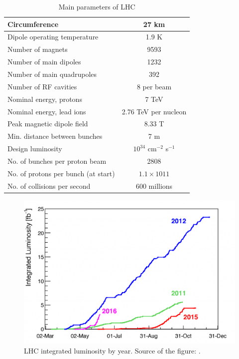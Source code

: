 \begin{table}[h]
  \begin{center}
  \caption{ Main parameters of LHC \cite{ref_LHC_brochure}}
  \vspace{5 mm}
  \begin{tabular}{|l|c|}
     \hline
     Circumference & 27 km  \\ \hline
     Dipole operating temperature &  1.9 K \\ \hline
     Number of magnets &  9593 \\ \hline
     Number of main dipoles &  1232 \\ \hline
     Number of main quadrupoles &  392 \\ \hline
     Number of RF cavities &  8 per beam \\ \hline
     Nominal energy, protons &  7 TeV \\ \hline
     Nominal energy, lead ions &  2.76 TeV per nucleon \\ \hline
     Peak magnetic dipole field &  8.33 T \\ \hline
     Min. distance between bunches &  7 m \\ \hline
     Design luminosity &  $10^{34}$ cm$^{-2}$ s$^{-1}$ \\ \hline
     No. of bunches per proton beam &  2808 \\ \hline
     No. of protons per bunch (at start) &  $1.1\times 10{11}$ \\ \hline
     No. of collisions per second &  600 millions \\ \hline
  \end{tabular}
  \label{tab:LHCparameters}
  \end{center}
 \end{table}

\begin{figure}
  \centering
  \includegraphics[width=.80\linewidth]{../figs/Exp/LHC_lumi.png}
  \caption{LHC integrated luminosity by year. Source of the figure: \cite{ref_fig_LHClumi}.}
  \label{fig:LHClumi}
\end{figure}

